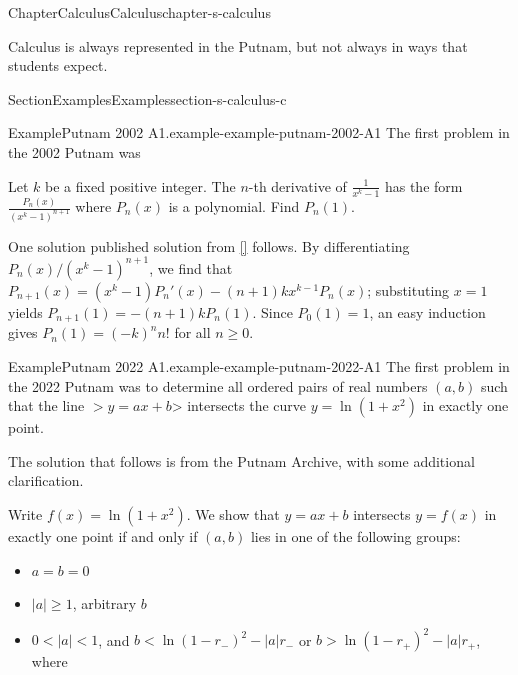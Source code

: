 \documentclass[oneside,10pt,]{book}
\newcommand{\xreffont}{\relax}
\numberwithin{equation}{section}
\newcommand{\lt}{<}
\newcommand{\gt}{>}
\begin{document}
%
%
\typeout{************************************************}
\typeout{************************************************}
%
\begin{chapterptx}{Chapter}{Calculus}{}{Calculus}{}{}{chapter-s-calculus}
\renewcommand*{\chaptername}{Chapter}
\begin{introduction}{}%
Calculus is always represented in the Putnam, but not always in ways that students expect.%
\end{introduction}%
%
%
\typeout{************************************************}
\typeout{************************************************}
%
\begin{sectionptx}{Section}{Examples}{}{Examples}{}{}{section-s-calculus-c}
\begin{example}{Example}{Putnam 2002 A1.}{example-example-putnam-2002-A1}%
The first problem in the 2002 Putnam was%
\par
Let \(k\) be a fixed positive integer. The \(n\)-th derivative of \(\frac{1}{x^k - 1}\) has the form \(\frac{P_n(x)}{(x^k - 1)^{n+1}}\) where \(P_n(x)\) is a polynomial. Find \(P_n(1)\).%
\par
One solution published solution from \hyperlink{biblio-biblio-putnam-archive}{[{\xreffont 10}]} follows.  By differentiating \(P_n(x)/(x^k-1)^{n+1}\), we find that \(P_{n+1}(x) = (x^k-1)P_n'(x)-(n+1)kx^{k-1}P_n(x)\); substituting \(x=1\) yields \(P_{n+1}(1) = -(n+1)k P_n(1)\).  Since \(P_0(1)=1\), an easy induction gives \(P_n(1) = (-k)^n n!\) for all \(n \geq 0\).%
\end{example}
\begin{example}{Example}{Putnam 2022 A1.}{example-example-putnam-2022-A1}%
The first problem in the 2022 Putnam was to determine all ordered pairs of real numbers \((a,b)\) such that the line \(>y = ax+b\)\textgreater{} intersects the curve \(y = \ln(1+x^2)\) in exactly one point.%
\par
The solution that follows is from the Putnam Archive, with some additional clarification.%
\par
Write \(f(x) = \ln(1+x^2)\). We show that \(y=ax+b\) intersects \(y=f(x)\) in exactly one point if and only if \((a,b)\) lies in one of the following groups:%
\begin{itemize}[label=\textbullet]
\item{}\(\displaystyle a=b=0\)%
\item{}\(|a| \geq 1\), arbitrary \(b\)%
\item{}\(0 \lt |a| \lt 1\), and \(b \lt \ln(1-r_-)^2-|a|r_-\) or \(b \gt \ln(1-r_+)^2-|a|r_+\), where%

\end{itemize}
\end{example}
\end{sectionptx}
\end{chapterptx}
\end{document}

